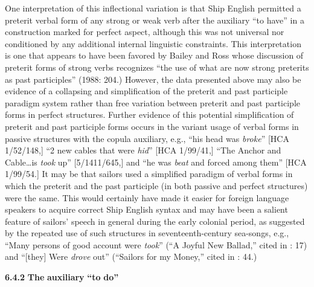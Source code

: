 One interpretation of this inflectional variation is that Ship English permitted a preterit verbal form of any strong or weak verb after the auxiliary “to have” in a construction marked for perfect aspect, although this was not universal nor conditioned by any additional internal linguistic constraints. This interpretation is one that appears to have been favored by Bailey and Ross whose discussion of preterit forms of strong verbs recognizes “the use of what are now strong preterits as past participles” (1988: 204.) However, the data presented above may also be evidence of a collapsing and simplification of the preterit and past participle paradigm system rather than free variation between preterit and past participle forms in perfect structures. Further evidence of this potential simplification of preterit and past participle forms occurs in the variant usage of verbal forms in passive structures with the copula auxiliary, e.g., “his head was \textit{broke}” [HCA 1/52/148,] “2 new cables that were \textit{hid}” [HCA 1/99/41,] “The Anchor and Cable…is \textit{took} up” [5/1411/645,] and “he was \textit{beat} and forced among them” [HCA 1/99/54.] It may be that sailors used a simplified paradigm of verbal forms in which the preterit and the past participle (in both passive and perfect structures) were the same. This would certainly have made it easier for foreign language speakers to acquire correct Ship English syntax and may have been a salient feature of sailors’ speech in general during the early colonial period, as suggested by the repeated use of such structures in seventeenth-century sea-songs, e.g., “Many persons of good account were \textit{took}” (“A Joyful New Ballad,” cited in \citealt{Palmer1986}: 17) and “[they] Were \textit{drove} out” (“Sailors for my Money,” cited in \citealt{Palmer1986}: 44.) 

\textbf{6.4.2} \textbf{The} \textbf{auxiliary} \textbf{“to} \textbf{do”}

